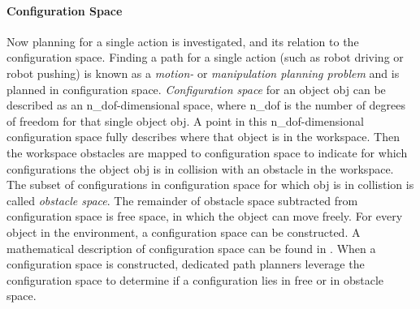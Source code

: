 \paragraph{Configuration Space}
Now planning for a single action is investigated, and its relation to the configuration space. Finding a path for a single action (such as robot driving or robot pushing) is known as a \textit{motion-} or \textit{manipulation planning problem} and is planned in configuration space. \textit{Configuration space} for an object \gls{obj} can be described as an \gls{n_dof}-dimensional space, where \gls{n_dof} is the number of degrees of freedom for that single object \gls{obj}. A point in this \gls{n_dof}-dimensional configuration space fully describes where that object is in the workspace. Then the workspace obstacles are mapped to configuration space to indicate for which configurations the object \gls{obj} is in collision with an obstacle in the workspace. The subset of configurations in configuration space for which \gls{obj} is in collistion is called \textit{obstacle space}. The remainder of obstacle space subtracted from configuration space is free space, in which the object can move freely. For every object in the environment, a configuration space can be constructed. A mathematical description of configuration space can be found in . When a configuration space is constructed, dedicated path planners leverage the configuration space to determine if a configuration lies in free or in obstacle space.\bs

